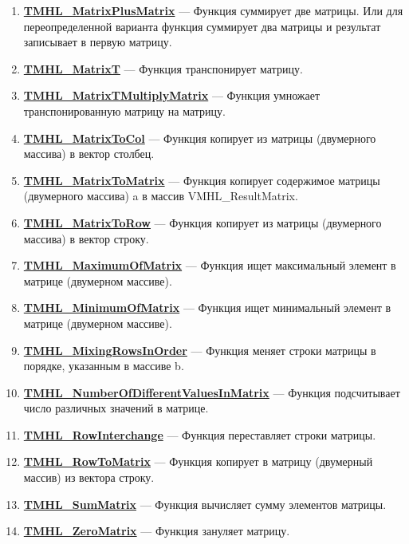 \documentclass[a4paper,12pt]{article}
\begin{document}
\begin{enumerate}
\item \textbf{\hyperref[TMHL_MatrixPlusMatrix]{TMHL\_MatrixPlusMatrix}} --- Функция суммирует две матрицы. Или для переопределенной варианта функция суммирует два матрицы и результат записывает в первую матрицу. 

\item \textbf{\hyperref[TMHL_MatrixT]{TMHL\_MatrixT}} --- Функция транспонирует матрицу.

\item \textbf{\hyperref[TMHL_MatrixTMultiplyMatrix]{TMHL\_MatrixTMultiplyMatrix}} --- Функция умножает транспонированную матрицу на матрицу.

\item \textbf{\hyperref[TMHL_MatrixToCol]{TMHL\_MatrixToCol}} --- Функция копирует из матрицы (двумерного массива) в вектор столбец.

\item \textbf{\hyperref[TMHL_MatrixToMatrix]{TMHL\_MatrixToMatrix}} --- Функция копирует содержимое матрицы (двумерного массива) a в массив VMHL\_ResultMatrix.

\item \textbf{\hyperref[TMHL_MatrixToRow]{TMHL\_MatrixToRow}} --- Функция копирует из матрицы (двумерного массива) в вектор строку.

\item \textbf{\hyperref[TMHL_MaximumOfMatrix]{TMHL\_MaximumOfMatrix}} --- Функция ищет максимальный элемент в матрице (двумерном массиве).

\item \textbf{\hyperref[TMHL_MinimumOfMatrix]{TMHL\_MinimumOfMatrix}} --- Функция ищет минимальный элемент в матрице (двумерном массиве).

\item \textbf{\hyperref[TMHL_MixingRowsInOrder]{TMHL\_MixingRowsInOrder}} --- Функция меняет строки матрицы в порядке, указанным в массиве b.

\item \textbf{\hyperref[TMHL_NumberOfDifferentValuesInMatrix]{TMHL\_NumberOfDifferentValuesInMatrix}} --- Функция подсчитывает число различных значений в матрице.

\item \textbf{\hyperref[TMHL_RowInterchange]{TMHL\_RowInterchange}} --- Функция переставляет строки матрицы.

\item \textbf{\hyperref[TMHL_RowToMatrix]{TMHL\_RowToMatrix}} --- Функция копирует в матрицу (двумерный массив) из вектора строку.

\item \textbf{\hyperref[TMHL_SumMatrix]{TMHL\_SumMatrix}} --- Функция вычисляет сумму элементов матрицы.

\item \textbf{\hyperref[TMHL_ZeroMatrix]{TMHL\_ZeroMatrix}} --- Функция зануляет матрицу.

\end{enumerate}
\end{document}
